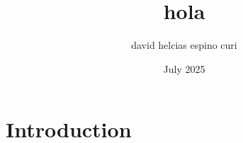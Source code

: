 \documentclass{article}
\title{hola}
\author{david helcias espino curi}
\date{July 2025}
\begin{document}
\maketitle

\section{Introduction}
\end{document}
